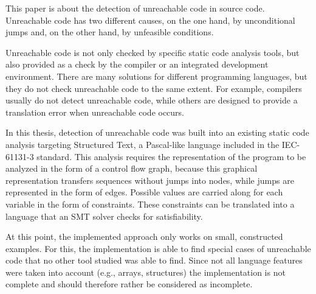 This paper is about the detection of unreachable code in source code. 
Unreachable code has two different causes, on the one hand, by unconditional jumps and, on the other hand, by unfeasible conditions.

Unreachable code is not only checked by specific static code analysis tools, but also provided as a check by the compiler or an integrated development environment. There are many solutions for different programming languages, but they do not check unreachable code to the same extent. For example, compilers usually do not detect unreachable code, while others are designed to provide a translation error when unreachable code occurs.


In this thesis, detection of unreachable code was built into an existing static code analysis targeting Structured Text, a Pascal-like language included in the IEC-61131-3 standard. This analysis requires the representation of the program to be analyzed in the form of a control flow graph, because this graphical representation transfers sequences without jumps into nodes, while jumps are represented in the form of edges. Possible values are carried along for each variable in the form of constraints. These constraints can be translated into a language that an SMT solver checks for satisfiability. 

At this point, the implemented approach only works on small, constructed examples. For this, the implementation is able to find special cases of unreachable code that no other tool studied was able to find. Since not all language features were taken into account (e.g., arrays, structures) the implementation is not complete and should therefore rather be considered as incomplete.

